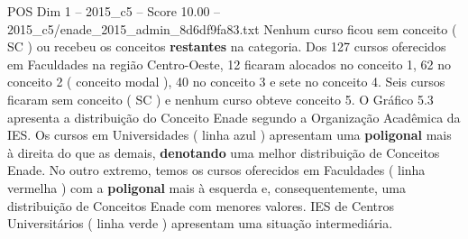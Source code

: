 \begin{textsample}{POS Dim 1 – 2015\_c5 – Score 10.00 – 2015\_c5/enade\_2015\_admin\_8d6df9fa83.txt}
Nenhum curso ficou sem conceito ( SC ) ou recebeu os conceitos \textbf{restantes} na categoria.
Dos 127 cursos oferecidos em Faculdades na região Centro-Oeste, 12 ficaram alocados no conceito 1, 62 no conceito 2 ( conceito modal ), 40 no conceito 3 e sete no conceito 4.
Seis cursos ficaram sem conceito ( SC ) e nenhum curso obteve conceito 5.
O Gráfico 5.3 apresenta a distribuição do Conceito Enade segundo a Organização Acadêmica da IES.
Os cursos em Universidades ( linha azul ) apresentam uma \textbf{poligonal} mais à direita do que as demais, \textbf{denotando} uma melhor distribuição de Conceitos Enade.
No outro extremo, temos os cursos oferecidos em Faculdades ( linha vermelha ) com a \textbf{poligonal} mais à esquerda e, consequentemente, uma distribuição de Conceitos Enade com menores valores.
IES de Centros Universitários ( linha verde ) apresentam uma situação intermediária.

\end{textsample}
